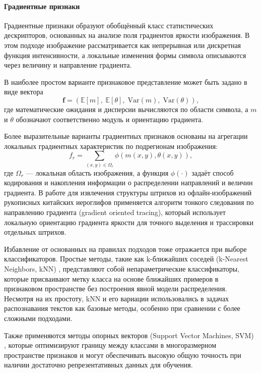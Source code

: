 \paragraph{Градиентные признаки} Градиентные признаки \cite{srikantan1996gradient} образуют обобщённый класс статистических дескрипторов, основанных на анализе поля градиентов яркости изображения. В этом подходе изображение рассматривается как непрерывная или дискретная функция интенсивности, а локальные изменения формы символа описываются через величину и направление градиента.

В наиболее простом варианте признаковое представление может быть задано в виде вектора
\[
    \mathbf{f} =
    \left(
    \mathbb{E}[m],\;
    \mathbb{E}[\theta],\;
    \mathrm{Var}(m),\;
    \mathrm{Var}(\theta)
    \right),
\]
где математические ожидания и дисперсии вычисляются по области символа, а $m$ и $\theta$ обозначают соответственно модуль и ориентацию градиента.

Более выразительные варианты градиентных признаков основаны на агрегации локальных градиентных характеристик по подрегионам изображения:
\[
    f_r =
    \sum_{(x,y)\in \Omega_r}
    \phi\!\left(
    m(x,y), \theta(x,y)
    \right),
\]
где $\Omega_r$ — локальная область изображения, а функция $\phi(\cdot)$ задаёт способ кодирования и накопления информации о распределении направлений и величин градиента. В работе \cite{chang1999analysis} для извлечения структуры штрихов из офлайн-изображений рукописных китайских иероглифов применяется алгоритм тонкого следования по направлению градиента (gradient oriented tracing), который использует локальную ориентацию градиента яркости для точного выделения и трассировки отдельных штрихов.

Избавление от основанных на правилах подходов тоже отражается при выборе классификаторов. Простые методы, такие как k-ближайших соседей (k-Nearest Neighbors, kNN) \cite{eko2021bonferroni}, представляют собой непараметрические классификаторы, которые присваивают метку класса на основе ближайших примеров в признаковом пространстве без построения явной модели распределения. Несмотря на их простоту, kNN и его вариации использовались в задачах распознавания текстов как базовые методы, особенно при сравнении с более сложными подходами.

Также применяются методы опорных векторов (Support Vector Machines, SVM) \cite{wang2008novel}, которые оптимизируют границу между классами в многоразмерном пространстве признаков и могут обеспечивать высокую общую точность при наличии достаточно репрезентативных данных для обучения.

